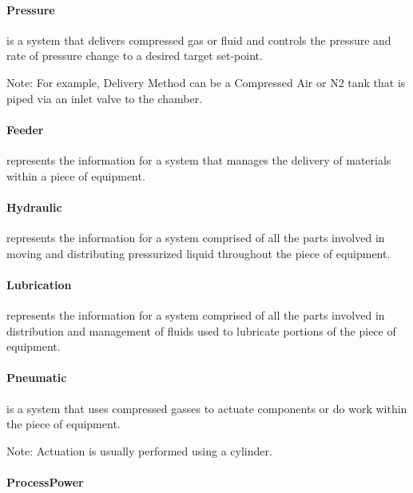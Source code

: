 \paragraph{Pressure}\mbox{}
\label{sec:Pressure}


 is a system that delivers compressed gas or fluid and controls the pressure and rate of pressure change to a desired target set-point.

Note: For example, Delivery Method can be a Compressed Air or N2 tank that is piped via an inlet valve to the chamber.


\paragraph{Feeder}\mbox{}
\label{sec:Feeder}


 represents the information for a system that manages the delivery of materials within a piece of equipment.


\paragraph{Hydraulic}\mbox{}
\label{sec:Hydraulic}


 represents the information for a system comprised of all the parts involved in moving and distributing pressurized liquid throughout the piece of equipment.


\paragraph{Lubrication}\mbox{}
\label{sec:Lubrication}


 represents the information for a system comprised of all the parts involved in distribution and management of fluids used to lubricate portions of the piece of equipment.


\paragraph{Pneumatic}\mbox{}
\label{sec:Pneumatic}


 is a system that uses compressed gasses to actuate components or do work within the piece of equipment.

Note: Actuation is usually performed using a cylinder.


\paragraph{ProcessPower}\mbox{}
\label{sec:ProcessPower}


